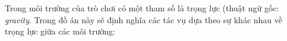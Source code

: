 Trong môi trường của trò chơi có một tham số là trọng lực (thuật ngữ gốc: \emph{gravity}. Trong đồ án này sẽ định nghĩa các tác vụ dựa theo sự khác nhau về trọng lực giữa các môi trường:
\begin{table} [H]
    \begin{center}
    \caption{Danh sách các tác vụ thực nghiệm bài toán FlappyBird}

    \end{center}
    \label{tab:result:flappybird}
\end{table}
